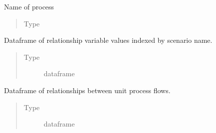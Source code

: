 \documentclass[a4paper,10pt,english]{sphinxmanual}
\begin{document}
\begin{fulllineitems}
\begin{fulllineitems}
\label{\detokenize{unit:unitprocess.UnitProcess.name}}
Name of process
\begin{quote}\begin{description}
\item[{Type}] \leavevmode
{}

\end{description}\end{quote}

\end{fulllineitems}


\begin{fulllineitems}
\label{\detokenize{unit:unitprocess.UnitProcess.var_df}}
Dataframe of relationship variable values
indexed by scenario name.
\begin{quote}\begin{description}
\item[{Type}] \leavevmode
dataframe

\end{description}\end{quote}

\end{fulllineitems}


\begin{fulllineitems}
\label{\detokenize{unit:unitprocess.UnitProcess.calc_df}}
Dataframe of relationships between unit
process flows.
\begin{quote}\begin{description}
\item[{Type}] \leavevmode
dataframe

\end{description}\end{quote}

\end{fulllineitems}



\end{fulllineitems}
\end{document}

